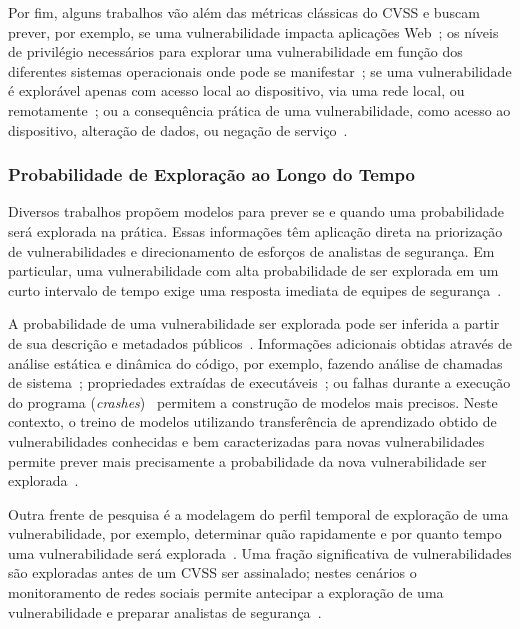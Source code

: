 Por fim, alguns trabalhos vão além das métricas clássicas do CVSS e buscam prever, por exemplo, se uma vulnerabilidade impacta aplicações Web~\cite{ruohonen2017classifying}; os níveis de privilégio necessários para explorar uma vulnerabilidade em função dos diferentes sistemas operacionais onde pode se manifestar~\cite{aksu2018automated}; se uma vulnerabilidade é explorável apenas com acesso local ao dispositivo, via uma rede local, ou remotamente~\cite{chen2010categorization}; ou a consequência prática de uma vulnerabilidade, como acesso ao dispositivo, alteração de dados, ou negação de serviço~\cite{chen2010categorization}.

\subsubsection{Probabilidade de Exploração ao Longo do Tempo}

Diversos trabalhos propõem modelos para prever se e quando uma probabilidade será explorada na prática. Essas informações têm aplicação direta na priorização de vulnerabilidades e direcionamento de esforços de analistas de segurança. Em particular, uma vulnerabilidade com alta probabilidade de ser explorada em um curto intervalo de tempo exige uma resposta imediata de equipes de segurança~\cite{le22survey}.

A probabilidade de uma vulnerabilidade ser explorada pode ser inferida a partir de sua descrição e metadados públicos~\cite{fang2020fastembed, jacobs2020improving, tavabi2018darkembed}. Informações adicionais obtidas através de análise estática e dinâmica do código, por exemplo, fazendo análise de chamadas de sistema~\cite{younis2014using}; propriedades extraídas de executáveis~\cite{yan17exploitmeter}; ou falhas durante a execução do programa (\emph{crashes})~\cite{tripathi2017exniffer} permitem a construção de modelos mais precisos. Neste contexto, o treino de modelos utilizando transferência de aprendizado obtido de vulnerabilidades conhecidas e bem caracterizadas para novas vulnerabilidades permite prever mais precisamente a probabilidade da nova vulnerabilidade ser explorada~\cite{yin2020apply}.

Outra frente de pesquisa é a modelagem do perfil temporal de exploração de uma vulnerabilidade, por exemplo, determinar quão rapidamente e por quanto tempo uma vulnerabilidade será explorada~\cite{bozorgi2010beyond, chen2019using}. Uma fração significativa de vulnerabilidades são exploradas antes de um CVSS ser assinalado; nestes cenários o monitoramento de redes sociais permite antecipar a exploração de uma vulnerabilidade e preparar analistas de segurança~\cite{chen2019using}.

